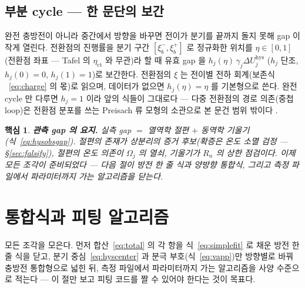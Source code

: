 \documentclass[11pt,a4paper]{article}
\newtheorem*{keybox}{핵심}
\newcommand{\hys}{\mathrm{hys}}
\begin{document}
\subsection{부분 cycle — 한 문단의 보간}
완전 충방전이 아니라 중간에서 방향을 바꾸면 전이가 분기를 끝까지 돌지 못해 gap 이 작게 열린다. 전환점의
진행률을 분기 구간 $[\xi_b^-,\xi_b^+]$ 로 정규화한 위치를 $\eta\in[0,1]$(전환점 좌표 — Tafel 의
$\eta_{\mathrm{ct}}$ 와 무관)라 할 때 유효 gap 을 $h_j(\eta)\,\gamma_j\Delta U_j^\hys$
($h_j$ 단조, $h_j(0)=0$, $h_j(1)=1$)로 보간한다. 전환점의 $\xi$ 는 전이별 전하 회계(보존식
~\eqref{eq:charge} 의 몫)로 읽으며, 데이터가 없으면 $h_j(\eta)=\eta$ 를 기본형으로 쓴다. 완전 cycle 만
다루면 $h_j=1$ 이라 앞의 식들이 그대로다 — 다중 전환점의 경로 의존(중첩 loop)은 전환점 분포를 쓰는
Preisach 류 모형의 소관으로 본 문건 범위 밖이다 \cite{sethna1993}.

\begin{keybox}
\textbf{관측 gap 의 요지.} 실측 gap $=$ 열역학 절편 $+$ 동역학 기울기(식~\eqref{eq:hysobsgap}). 절편의
존재가 상분리의 증거 후보(확증은 온도 소멸 검정 — \S\ref{sec:falsify}), 절편의 온도 의존이
$\Omega_j$ 의 열쇠, 기울기가 $R_n$ 의 상한 점검이다. 이제 모든
조각이 준비되었다 — 다음 절이 방전 한 줄 식과 양방향 통합식, 그리고 측정 파일에서 파라미터까지 가는
알고리즘을 닫는다.
\end{keybox}

\section{통합식과 피팅 알고리즘}\label{sec:master}
모든 조각을 모은다. 먼저 합산~\eqref{eq:total} 의 각 항을 식~\eqref{eq:simplefit} 로 채운 방전
한 줄 식을 닫고, 분기 중심~\eqref{eq:hyscenter} 과 분극 부호(식~\eqref{eq:vapp})만 방향별로 바꿔
충방전 통합형으로 넓힌 뒤, 측정 파일에서 파라미터까지 가는 알고리즘을 사양 수준으로 적는다 — 이 절만 보고 피팅 코드를 짤 수
있어야 한다는 것이 목표다.
\end{document}
